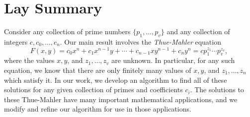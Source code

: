 

\chapter{Lay Summary}

Consider any collection of prime numbers $\{p_1, \dots, p_v\}$ and any collection of integers $c, c_0, \dots, c_n$. Our main result involves the \textit{Thue-Mahler} equation
\[F(x,y) = c_0x^n + c_1x^{n-1}y + \cdots + c_{n-1}xy^{n-1} + c_ny^n = cp_1^{z_1}\cdots p_v^{z_v},\]
where the values $x, y$, and $z_1, \dots, z_v$ are unknown. In particular, for any such equation, we know that there are only finitely many values of $x,y$, and $z_1, \dots, z_n$ which satisfy it. In our work, we develop an algorithm to find all of these solutions for any given collection of primes and coefficients $c_i$. The solutions to these Thue-Mahler have many important mathematical applications, and we modify and refine our algorithm for use in those applications.


\endinput

The lay or public summary explains the key goals and contributions of
the research\slash{}scholarly work in terms that can be understood by the
general public. It must not exceed 150 words in length.
